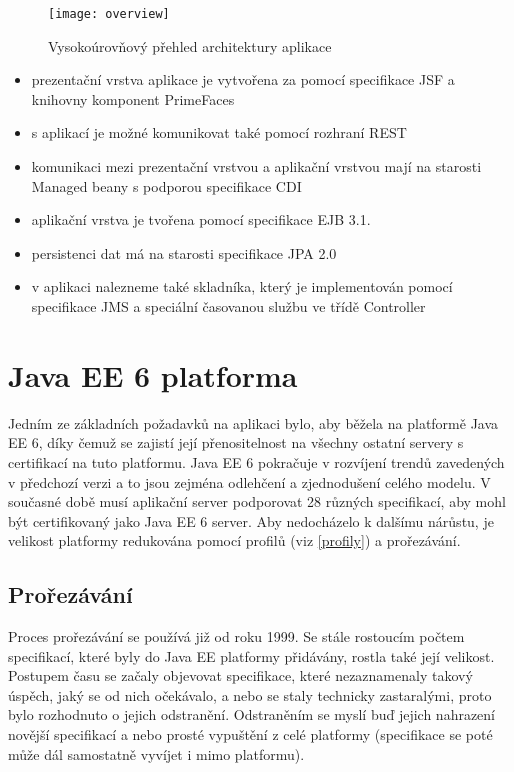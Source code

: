 \documentclass[122pt,oneside]{fithesis}
\begin{document}
\begin{figure}[!ht]
\centering
\texttt{[image: overview]}
\caption{Vysokoúrovňový přehled architektury aplikace}
\label{img:overview}
\end{figure}

\begin{itemize}
  \item prezentační vrstva aplikace je vytvořena za pomocí specifikace JSF a knihovny komponent PrimeFaces
  \item s aplikací je možné komunikovat také pomocí rozhraní REST
  \item komunikaci mezi prezentační vrstvou a aplikační vrstvou mají na starosti Managed beany s podporou specifikace CDI
  \item aplikační vrstva je tvořena pomocí specifikace EJB 3.1.
  \item persistenci dat má na starosti specifikace JPA 2.0
  \item v aplikaci nalezneme také skladníka, který je implementován pomocí specifikace JMS a speciální časovanou službu ve třídě Controller
\end{itemize}

\section{Java EE 6 platforma}
Jedním ze základních požadavků na aplikaci bylo, aby běžela na platformě Java EE 6, díky čemuž se zajistí její přenositelnost na všechny ostatní servery s certifikací na tuto platformu. Java EE 6 pokračuje v rozvíjení trendů zavedených v předchozí verzi a to jsou zejména odlehčení a zjednodušení celého modelu. V současné době musí aplikační server podporovat 28 různých specifikací, aby mohl být certifikovaný jako Java EE 6 server. Aby nedocházelo k dalšímu nárůstu, je velikost platformy redukována pomocí profilů (viz \ref{profily}) a prořezávání. 
\subsection{Prořezávání}
\label{pruning}
Proces prořezávání se používá již od roku 1999. Se stále rostoucím počtem specifikací, které byly do Java EE platformy přidávány, rostla také její velikost. Postupem času se začaly objevovat specifikace, které nezaznamenaly takový úspěch, jaký se od nich očekávalo, a nebo se staly technicky zastaralými, proto bylo rozhodnuto o jejich odstranění. Odstraněním se myslí buď jejich nahrazení novější specifikací a nebo prosté vypuštění z celé platformy (specifikace se poté může dál samostatně vyvíjet i mimo platformu).
\end{document}
